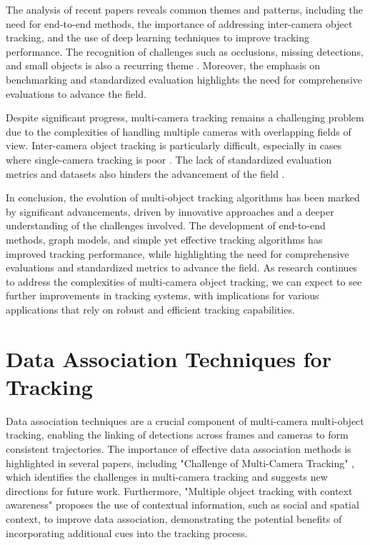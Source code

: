 \documentclass[conference]{IEEEtran}
\begin{document}
The analysis of recent papers reveals common themes and patterns, including the need for end-to-end methods, the importance of addressing inter-camera object tracking, and the use of deep learning techniques to improve tracking performance. The recognition of challenges such as occlusions, missing detections, and small objects is also a recurring theme \cite{Challenge of Multi-Camera Tracking}. Moreover, the emphasis on benchmarking and standardized evaluation highlights the need for comprehensive evaluations to advance the field.

Despite significant progress, multi-camera tracking remains a challenging problem due to the complexities of handling multiple cameras with overlapping fields of view. Inter-camera object tracking is particularly difficult, especially in cases where single-camera tracking is poor \cite{An equalised global graphical model-based approach for multi-camera object tracking}. The lack of standardized evaluation metrics and datasets also hinders the advancement of the field \cite{Tracking the Trackers: An Analysis of the State of the Art in Multiple Object Tracking}.

In conclusion, the evolution of multi-object tracking algorithms has been marked by significant advancements, driven by innovative approaches and a deeper understanding of the challenges involved. The development of end-to-end methods, graph models, and simple yet effective tracking algorithms has improved tracking performance, while highlighting the need for comprehensive evaluations and standardized metrics to advance the field. As research continues to address the complexities of multi-camera object tracking, we can expect to see further improvements in tracking systems, with implications for various applications that rely on robust and efficient tracking capabilities.

\section{Data Association Techniques for Tracking}
Data association techniques are a crucial component of multi-camera multi-object tracking, enabling the linking of detections across frames and cameras to form consistent trajectories. The importance of effective data association methods is highlighted in several papers, including "Challenge of Multi-Camera Tracking" \cite{Challenge of Multi-Camera Tracking}, which identifies the challenges in multi-camera tracking and suggests new directions for future work. Furthermore, "Multiple object tracking with context awareness" \cite{Multiple object tracking with context awareness} proposes the use of contextual information, such as social and spatial context, to improve data association, demonstrating the potential benefits of incorporating additional cues into the tracking process.
\end{document}

